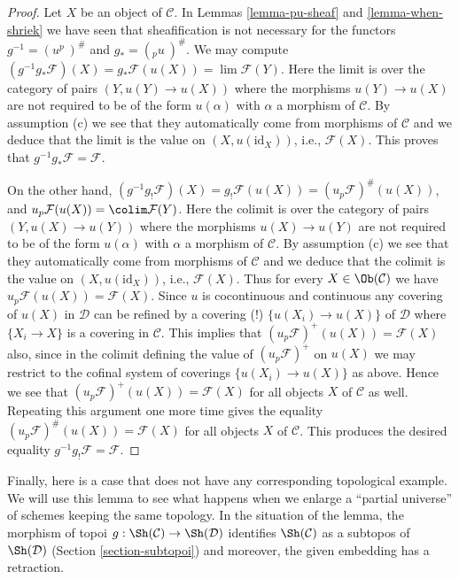 \begin{proof}
Let $X$ be an object of $\mathcal{C}$.
In Lemmas \ref{lemma-pu-sheaf} and \ref{lemma-when-shriek} we have seen that
sheafification is not necessary for the functors
$g^{-1} = (u^p\ )^\#$ and $g_{*} = ({}_pu\ )^\#$.
We may compute
$(g^{-1}g_{*}\mathcal{F})(X) = g_{*}\mathcal{F}(u(X))
= \lim \mathcal{F}(Y)$. Here the limit
is over the category of pairs $(Y, u(Y) \to u(X))$
where the morphisms $u(Y) \to u(X)$ are not required to be
of the form $u(\alpha)$ with $\alpha$ a morphism of $\mathcal{C}$.
By assumption (c) we see that they automatically come from
morphisms of $\mathcal{C}$ and we deduce that the limit is the
value on $(X, u(\text{id}_X))$, i.e., $\mathcal{F}(X)$.
This proves that $g^{-1}g_{*}\mathcal{F} = \mathcal{F}$.

\medskip\noindent
On the other hand, $(g^{-1}g_{!}\mathcal{F})(X) =
g_{!}\mathcal{F}(u(X)) = (u_p\mathcal{F})^\#(u(X))$, and
$u_p\mathcal{F}(u(X)) = \colim \mathcal{F}(Y)$.
Here the colimit is over the category of pairs $(Y, u(X) \to u(Y))$
where the morphisms $u(X) \to u(Y)$ are not required to be
of the form $u(\alpha)$ with $\alpha$ a morphism of $\mathcal{C}$.
By assumption (c) we see that they automatically come
from morphisms of $\mathcal{C}$ and we deduce that the colimit is the
value on $(X, u(\text{id}_X))$, i.e., $\mathcal{F}(X)$. Thus for every
$X \in \Ob(\mathcal{C})$ we have
$u_p\mathcal{F}(u(X)) = \mathcal{F}(X)$.
Since $u$ is cocontinuous and continuous any covering of $u(X)$ in
$\mathcal{D}$ can be refined by a covering (!) $\{u(X_i) \to u(X)\}$
of $\mathcal{D}$ where $\{X_i \to X\}$ is a covering in $\mathcal{C}$.
This implies that $(u_p\mathcal{F})^+(u(X)) = \mathcal{F}(X)$ also,
since in the colimit defining the value of $(u_p\mathcal{F})^+$
on $u(X)$ we may restrict to the cofinal system of coverings
$\{u(X_i) \to u(X)\}$ as above. Hence we see that
$(u_p\mathcal{F})^+(u(X)) = \mathcal{F}(X)$ for all objects $X$
of $\mathcal{C}$ as well. Repeating this argument one more time
gives the equality $(u_p\mathcal{F})^\#(u(X)) = \mathcal{F}(X)$
for all objects $X$ of $\mathcal{C}$. This produces the desired
equality $g^{-1}g_!\mathcal{F} = \mathcal{F}$.
\end{proof}

\noindent
Finally, here is a case that does not have any corresponding topological
example. We will use this lemma to see what happens when we enlarge a
``partial universe'' of schemes keeping the same topology. In the situation
of the lemma, the morphism of topoi $g : \Sh(\mathcal{C}) \to \Sh(\mathcal{D})$
identifies $\Sh(\mathcal{C})$ as a subtopos of $\Sh(\mathcal{D})$
(Section \ref{section-subtopoi}) and moreover, the given embedding has a
retraction.

